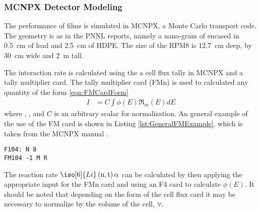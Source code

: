 \subsubsection{MCNPX Detector Modeling}
\label{sec:MCNPDetectorModelingMethod}
The performance of films is simulated in MCNPX, a Monte Carlo transport code\cite{pelowitz_mcnpx_????}.
The geometry is as in the PNNL reports, namely a nano-gram of   encased in \SI{0.5}{\cm} of lead and \SI{2.5}{\cm} of HDPE. 
The size of the RPM8 is \SI{12.7}{\cm} deep, by \SI{30}{\cm} wide and \SI{2}{\m} tall.

The interaction rate is calculated using the a cell flux tally in MCNPX and a tally multiplier card.
The tally multiplier card (FMn) is used to calculated any quantity of the form \eqref{eqn:FMCardForm} \cite{pelowitz_mcnpx_????}
\begin{align}
  \label{eqn:FMCardForm}
  I &= C\int\phi(E)\Re_m(E)dE
\end{align}
where ,  ,  and $C$ is an arbitrary scalar for normalization.
An general example of the use of the FM card is shown in Listing \ref{lst:GeneralFMExample}, which is taken from the MCNPX manual \cite{pelowitz_mcnpx_????}.
\begin{lstlisting}[caption={[Example usage of the FM card]Example usage of the FM card to calculate the number of reactions per \si{\cm\cubed} of type R in cell 8 of material M. The normalization is by atomic density, signified by the -1},label={lst:GeneralFMExample}]
F104: N 8
FM104 -1 M R
\end{lstlisting}

The reaction rate $\iso[6]{Li}\left(\text{n},\text{t}\right)\alpha$ can be calculated by then applying the appropriate input for the FMn card and using an F4 card to calculate $\phi(E)$.
It should be noted that depending on the form of the cell flux card it may be necessary to normalize by the volume of the cell, $\forall$.

